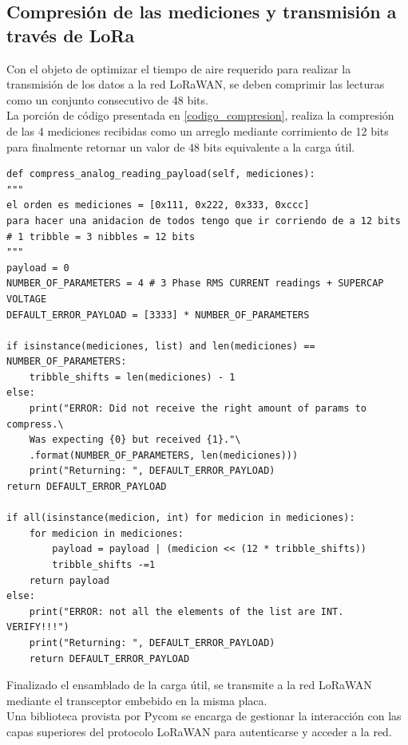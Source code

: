 \subsection{Compresión de las mediciones y transmisión a través de LoRa}\label{compresion_lecturas}
Con el objeto de optimizar el tiempo de aire requerido para realizar la transmisión de los datos a la red LoRaWAN, se deben comprimir las lecturas como un conjunto consecutivo de 48 bits.\\
La porción de código presentada en \ref{codigo_compresion}, realiza la compresión de las 4 mediciones recibidas como un arreglo mediante corrimiento de 12 bits para finalmente retornar un valor de 48 bits equivalente a la carga útil.\\

\lstset{language=python}
\begin{lstlisting}[label=codigo_compresion,caption=Función encargada de comprimir las 4 lecturas de 12 bits.]
def compress_analog_reading_payload(self, mediciones):
"""
el orden es mediciones = [0x111, 0x222, 0x333, 0xccc]
para hacer una anidacion de todos tengo que ir corriendo de a 12 bits
# 1 tribble = 3 nibbles = 12 bits
"""
payload = 0
NUMBER_OF_PARAMETERS = 4 # 3 Phase RMS CURRENT readings + SUPERCAP VOLTAGE
DEFAULT_ERROR_PAYLOAD = [3333] * NUMBER_OF_PARAMETERS

if isinstance(mediciones, list) and len(mediciones) == NUMBER_OF_PARAMETERS:
	tribble_shifts = len(mediciones) - 1
else:
	print("ERROR: Did not receive the right amount of params to compress.\
	Was expecting {0} but received {1}."\
	.format(NUMBER_OF_PARAMETERS, len(mediciones)))
	print("Returning: ", DEFAULT_ERROR_PAYLOAD)
return DEFAULT_ERROR_PAYLOAD

if all(isinstance(medicion, int) for medicion in mediciones):
	for medicion in mediciones:
		payload = payload | (medicion << (12 * tribble_shifts))
		tribble_shifts -=1
	return payload
else:
	print("ERROR: not all the elements of the list are INT. VERIFY!!!")
	print("Returning: ", DEFAULT_ERROR_PAYLOAD)
	return DEFAULT_ERROR_PAYLOAD
\end{lstlisting}

Finalizado el ensamblado de la carga útil, se transmite a la red LoRaWAN mediante el transceptor embebido en la misma placa.\\
Una biblioteca provista por Pycom se encarga de gestionar la interacción con las capas superiores del protocolo LoRaWAN para autenticarse y acceder a la red.\\


